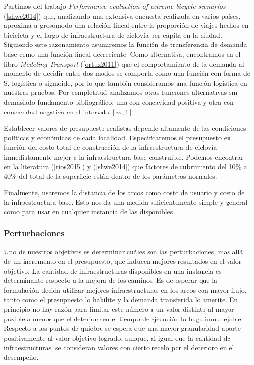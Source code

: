 \documentclass{article}
\begin{document}
  Partimos del trabajo {\it Performance evaluation of extreme bicycle scenarios} (\ref{shwe2014}) que, analizando una extensiva encuesta realizada en varios países, aproxima a grosomodo una relación lineal entre la proporción de viajes hechos en bicicleta y el largo de infraestructura de ciclovía per cápita en la ciudad. Siguiendo este razonamiento asumiremos la función de transferencia de demanda base como una función lineal decreciente. Como alternativa, encontramos en el libro {\it Modeling Transport} (\ref{ortuz2011}) que el comportamiento de la demanda al momento de decidir entre dos modos se comporta como una función con forma de S, logística o sigmoide, por lo que también consideramos una función logística en nuestras pruebas. Por completitud analizamos otras funciones alternativas sin demasiado fundamento bibliográfico: una con concavidad positiva y otra con concavidad negativa en el intervalo $[m, 1]$.

  Establecer valores de presupuesto realistas depende altamente de las condiciones políticas y económicas de cada localidad. Especificaremos el presupuesto en función del costo total de construcción de la infraestructura de ciclovía inmediatamente mejor a la infraestructura base construible. Podemos encontrar en la literatura (\ref{rios2015}) y (\ref{shwe2014}) que factores de cubrimiento del 10\% a 40\% del total de la superficie están dentro de los parámetros normales.

  Finalmente, usaremos la distancia de los arcos como costo de usuario y costo de la infraestructura base. Esto nos da una medida suficientemente simple y general como para usar en cualquier instancia de las disponibles.

  \FloatBarrier
  \subsubsection{Perturbaciones}

  Uno de nuestros objetivos es determinar cuáles son las perturbaciones, mas allá de un incremento en el presupuesto, que inducen mejores resultados en el valor objetivo. La cantidad de infraestructuras disponibles en una instancia es determinante respecto a la mejora de los caminos. Es de esperar que la formulación decida utilizar mejores infraestructuras en los arcos con mayor flujo, tanto como el presupuesto lo habilite y la demanda transferida lo amerite. En principio no hay razón para limitar este número a un valor distinto al mayor posible a menos que el deterioro en el tiempo de ejecución lo haga inmanejable. Respecto a los puntos de quiebre se espera que una mayor granularidad aporte positivamente al valor objetivo logrado, aunque, al igual que la cantidad de infraestructuras, se consideran valores con cierto recelo por el deterioro en el desempeño.
\end{document}
